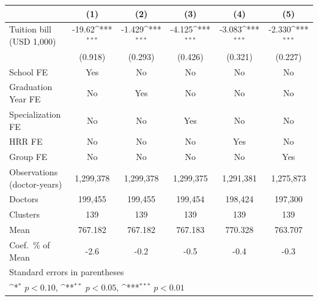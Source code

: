 {
\def\sym#1{\ifmmode^{#1}\else\(^{#1}\)\fi}
\begin{tabular}{l*{5}{c}}
\hline\hline
                    &\multicolumn{1}{c}{(1)}         &\multicolumn{1}{c}{(2)}         &\multicolumn{1}{c}{(3)}         &\multicolumn{1}{c}{(4)}         &\multicolumn{1}{c}{(5)}         \\
\hline
Tuition bill (USD 1,000)&      -19.62\sym{***}&      -1.429\sym{***}&      -4.125\sym{***}&      -3.083\sym{***}&      -2.330\sym{***}\\
                    &     (0.918)         &     (0.293)         &     (0.426)         &     (0.321)         &     (0.227)         \\
[1em]
School FE           &         Yes         &          No         &          No         &          No         &          No         \\
[1em]
Graduation Year FE  &          No         &         Yes         &          No         &          No         &          No         \\
[1em]
Specialization FE   &          No         &          No         &         Yes         &          No         &          No         \\
[1em]
HRR FE              &          No         &          No         &          No         &         Yes         &          No         \\
[1em]
Group FE            &          No         &          No         &          No         &          No         &         Yes         \\
\hline
Observations (doctor-years)&   1,299,378         &   1,299,378         &   1,299,375         &   1,291,381         &   1,275,873         \\
Doctors             &     199,455         &     199,455         &     199,454         &     198,424         &     197,300         \\
Clusters            &         139         &         139         &         139         &         139         &         139         \\
Mean                &     767.182         &     767.182         &     767.183         &     770.328         &     763.707         \\
Coef.\ \% of Mean   &        -2.6         &        -0.2         &        -0.5         &        -0.4         &        -0.3         \\
\hline\hline
\multicolumn{6}{l}{\footnotesize Standard errors in parentheses}\\
\multicolumn{6}{l}{\footnotesize \sym{*} \(p<0.10\), \sym{**} \(p<0.05\), \sym{***} \(p<0.01\)}\\
\end{tabular}
}
